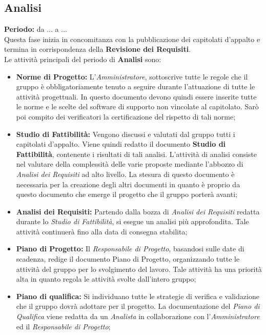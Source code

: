 	\subsection{Analisi}
	\textbf{Periodo:} da ... a ... \\
	Questa fase inizia in concomitanza con la pubblicazione dei capitolati d'appalto e termina in 		 corrispondenza della \textbf{Revisione dei Requisiti}. \\
	Le attività principali del periodo di \textbf{Analisi} sono: \\
	\begin{itemize}
		\item \textbf{Norme di Progetto:} L'\textit{Amministratore}, sottoscrive tutte le regole che il gruppo è obbligatoriamente tenuto a seguire durante l'attuazione di tutte le attività progettuali. In questo documento devono quindi essere inserite tutte le norme e le scelte del software di supporto non vincolate al capitolato. Sarò poi compito dei verificatori la certificazione del rispetto di tali norme; \\
		\item \textbf{Studio di Fattibilità:} Vengono discussi e valutati dal gruppo tutti i capitolati d'appalto. Viene quindi redatto il documento \textbf{Studio di Fattibilità}, contenente i risultati di tali analisi. L'attività di analisi consiste nel valutare della complessità delle varie proposte mediante l'abbozzo di \textit{Analisi dei Requisiti} ad alto livello. La stesura di questo documento è necessaria per la creazione degli altri documenti in quanto è proprio da questo documento che emerge il progetto che il gruppo porterà avanti; \\
		\item \textbf{Analisi dei Requisiti:} Partendo dalla bozza di \textit{Analisi dei Requisiti} redatta durante lo \textit{Studio di Fattibilità}, si esegue un analisi più approfondita. Tale attività continuerà fino alla data di consegna stabilita; \\
		\item \textbf{Piano di Progetto:} Il \textit{Responsabile di Progetto}, basandosi sulle date di scadenza, redige il documento Piano di Progetto, organizzando tutte le attività del gruppo per lo svolgimento del lavoro. Tale attività ha una priorità alta in quanto regola le attività svolte dall'intero gruppo; \\
		\item \textbf{Piano di qualifica:} Si individuano tutte le strategie di verifica e validazione che il gruppo dovrà adottare per il progetto. La documentazione del \textit{Piano di Qualifica} viene redatta da un \textit{Analista} in collaborazione con l'\textit{Amministratore} ed il \textit{Responsabile di Progetto}; \\

\end{itemize}
